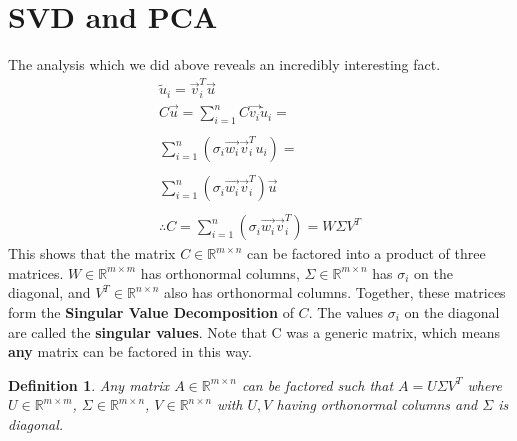 \documentclass{article}
\newtheorem{definition}{Definition}
\begin{document}
\section{SVD and PCA}
The analysis which we did above reveals an incredibly interesting fact.
\[
    \begin{array}{c}
        \tilde{u}_i=\vec{v}_i^T\vec{u}\\
        C\vec{u}=\sum_{i=1}^{n}{C\vec{v_i}\tilde{u}_i}=\\\\
        \sum_{i=1}^{n}{(\sigma_i\vec{w_i}\vec{v}^T_iu_i)}=\\\\
        \sum_{i=1}^{n}{(\sigma_i\vec{w_i}\vec{v}^T_i)} \vec{u}\\\\
        \therefore C = \sum_{i=1}^{n}{(\sigma_i\vec{w_i}\vec{v}^T_i)} = W\Sigma V^T
    \end{array}
\]
This shows that the matrix $C\in \mathbb{R}^{m \times n}$ can be factored into a product of three matrices.
$W\in \mathbb{R}^{m \times m}$ has orthonormal columns, $\Sigma \in \mathbb{R}^{m \times n}$ has $\sigma_i$ on the diagonal, and $V^T \in \mathbb{R}^{n \times n}$ also has orthonormal columns.
Together, these matrices form the \textbf{Singular Value Decomposition} of $C$. The values $\sigma_i$ on the diagonal are called the \textbf{singular values}. Note that C was a generic matrix, which means \textbf{any} matrix can be factored in this way. 
\begin{definition}
    Any matrix $A\in \mathbb{R}^{m\times n}$ can be factored such that $A = U\Sigma V^T$
     where $U\in \mathbb{R}^{m\times m}$, $\Sigma \in \mathbb{R}^{m \times n}$, $V\in \mathbb{R}^{n \times n}$
     with $U,V$ having orthonormal columns and $\Sigma$ is diagonal. 
\end{definition}
\end{document}
